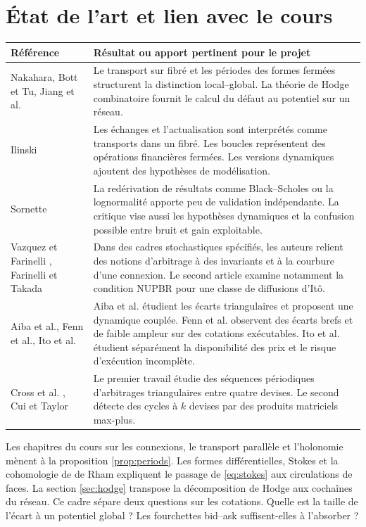 \documentclass[11pt,a4paper]{article}
\theoremstyle{clair}
\begin{document}
\section{État de l'art et lien avec le cours}
\label{sec:etatart}
\small
\begin{tabularx}{\textwidth}{@{}>{\raggedright\arraybackslash}p{}Y@{}}
\toprule
\textbf{Référence} & \textbf{Résultat ou apport pertinent pour le projet}\\
\midrule
Nakahara, Bott et Tu, Jiang et al. \cite{nakahara,botttu,hodge} &
Le transport sur fibré et les périodes des formes fermées structurent la distinction local--global. La théorie de Hodge combinatoire fournit le calcul du défaut au potentiel sur un réseau.\\
Ilinski \cite{ilinski97,ilinski} &
Les échanges et l'actualisation sont interprétés comme transports dans un fibré. Les boucles représentent des opérations financières fermées. Les versions dynamiques ajoutent des hypothèses de modélisation.\\
Sornette \cite{sornette} &
La redérivation de résultats comme Black--Scholes ou la lognormalité apporte peu de validation indépendante. La critique vise aussi les hypothèses dynamiques et la confusion possible entre bruit et gain exploitable.\\
Vazquez et Farinelli \cite{vazquez}, Farinelli et Takada \cite{farinelli} &
Dans des cadres stochastiques spécifiés, les auteurs relient des notions d'arbitrage à des invariants et à la courbure d'une connexion. Le second article examine notamment la condition NUPBR pour une classe de diffusions d'Itô.\\
Aiba et al., Fenn et al., Ito et al. \cite{aiba,fenn,ito} &
Aiba et al. étudient les écarts triangulaires et proposent une dynamique couplée. Fenn et al. observent des écarts brefs et de faible ampleur sur des cotations exécutables. Ito et al. étudient séparément la disponibilité des prix et le risque d'exécution incomplète.\\
Cross et al. \cite{cross}, Cui et Taylor \cite{cui} &
Le premier travail étudie des séquences périodiques d'arbitrages triangulaires entre quatre devises. Le second détecte des cycles à $k$ devises par des produits matriciels max-plus.\\
\bottomrule
\end{tabularx}
\normalsize

Les chapitres du cours sur les connexions, le transport parallèle et l'holonomie mènent à la proposition \ref{prop:periods}. Les formes différentielles, Stokes et la cohomologie de de Rham expliquent le passage de \eqref{eq:stokes} aux circulations de faces. La section \ref{sec:hodge} transpose la décomposition de Hodge aux cochaînes du réseau. Ce cadre sépare deux questions sur les cotations. Quelle est la taille de l'écart à un potentiel global ? Les fourchettes bid--ask suffisent-elles à l'absorber ?
\end{document}
